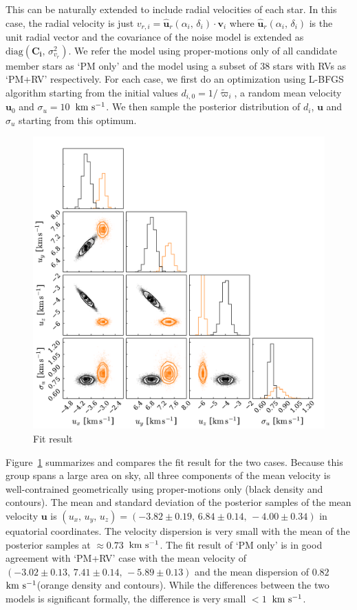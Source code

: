 \documentclass[modern,letterpaper]{aastex61}
\newcommand{\figname}{Figure}
\newcommand{\bs}[1]{\boldsymbol{#1}}
\newcommand{\mat}[1]{\mathbf{#1}}
\renewcommand{\vec}[1]{\bs{#1}}
\newcommand{\kms}{\ensuremath{\rm km~s^{-1}}}
\begin{document}
This can be naturally extended to include radial velocities of each star.
In this case, the radial velocity is just $v_{r,i} =
\hat{\vec{u}}_r(\alpha_i,\,\delta_i) \cdot \vec{v}_i$
where $\hat{\vec{u}}_r(\alpha_i,\,\delta_i)$ is the unit radial vector
and the covariance of the noise model
is extended as $\mathrm{diag}(\mat{C_i},\,\sigma_{v_r}^2)$.
We refer the model using proper-motions only of all candidate member stars as `PM only'
and the model using a subset of 38 stars with RVs as `PM+RV' respectively.
For each case, we first do an optimization using L-BFGS algorithm starting from
the initial values $d_{i,0} = 1/{\tilde \varpi_i}$, a random mean velocity
$\vec{u}_0$ and $\sigma_u=10$~\kms.
We then sample the posterior distribution of $d_i$, $\vec{u}$ and $\sigma_u$
starting from this optimum.


\begin{figure}
  \includegraphics[width=0.95\linewidth]{isotropic.pdf}
  \caption{Fit result}
  \label{fig:fit}
\end{figure}

\figname~\ref{fig:fit} summarizes and compares the fit result for the two cases.
Because this group spans a large area on sky, all three components of the mean
velocity is well-contrained geometrically using proper-motions only
(black density and contours).
The mean and standard deviation of the posterior samples of the mean velocity $\vec{u}$
is $(u_x,\,u_y,\,u_z) = (-3.82\pm0.19,\,6.84\pm0.14,\,-4.00\pm0.34)$ in
equatorial coordinates.
The velocity dispersion is very small with the mean of the posterior samples at
$\approx 0.73$~\kms.
The fit result of `PM only' is in good agreement with `PM+RV' case
with the mean velocity of $(-3.02\pm0.13,\,7.41\pm0.14,\,-5.89\pm0.13)$ and
the mean dispersion of $0.82$~\kms (orange density and contours).
While the differences between the two models is significant formally,
the difference is very small $<1$~\kms.
\end{document}
